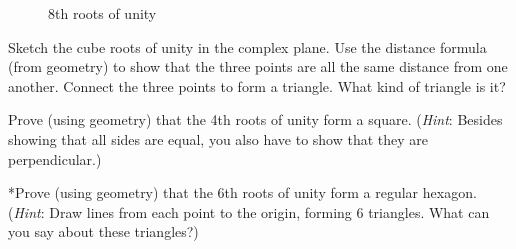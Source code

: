 {%
\begin{figure}[hbt]
\begin{center}

\end{center}
\caption{8th roots of unity}
\label{rtsunity}
\end{figure}
 
\begin{exercise}\label{exercise:complex:52}
Sketch the cube roots of unity in the complex plane. Use the distance formula (from geometry) to show that the three points are all the same distance from one another.  Connect the three points to form a triangle. What kind of triangle is it?
\end{exercise}

\begin{exercise}\label{exercise:complex:53}
Prove (using geometry) that the 4th roots of unity form a square. (\emph{Hint}: Besides showing that all sides are equal, you also have to show that they are perpendicular.)
\end{exercise}

\begin{exercise}\label{exercise:complex:54}
*Prove (using geometry) that the 6th roots of unity form a regular hexagon. (\emph{Hint}: Draw lines from each point to the origin, forming 6 triangles. What can you say about these triangles?)
\end{exercise}

}
